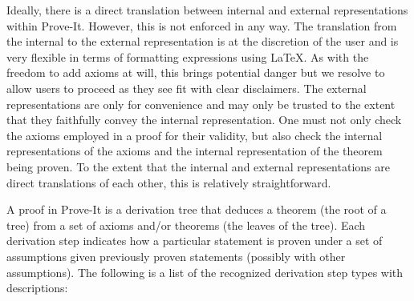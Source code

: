 \documentclass{article}[12pt]
\begin{document}
Ideally, there is a direct translation between internal and external representations within Prove-It.  However, this is not enforced in any way.  The translation from the internal to the external representation is at the discretion of the user and is very flexible in terms of formatting expressions using LaTeX.  As with the freedom to add axioms at will, this brings potential danger but we resolve to allow users to proceed as they see fit with clear disclaimers.  The external representations are only for convenience and may only be trusted to the extent that they faithfully convey the internal representation.  One must not only check the axioms employed in a proof for their validity, but also check the internal representations of the axioms and the internal representation of the theorem being proven.  To the extent that the internal and external representations are direct translations of each other, this is relatively straightforward.

A proof in Prove-It is a derivation tree that deduces a theorem (the root of a tree) from a set of axioms and/or theorems (the leaves of the tree).  Each derivation step indicates how a particular statement is proven under a set of assumptions given previously proven statements (possibly with other assumptions).  The following is a list of the recognized derivation step types with descriptions:
\end{document}
